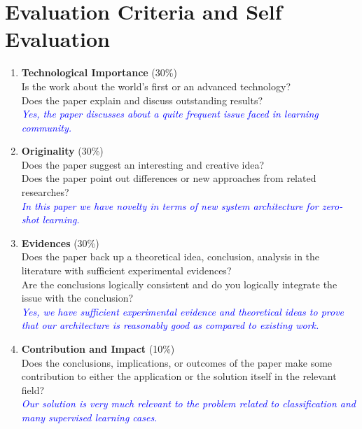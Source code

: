 \documentclass[11pt, conference, english]{IEEEtran}
\theoremstyle{plain}
\theoremstyle{definition}
\theoremstyle{remark}
\newcommand{\blue}[1]{\textcolor{blue}{#1}}
\begin{document}
	
	
	
	
	
	

\onecolumn
\section{Evaluation Criteria and Self Evaluation}
\begin{enumerate}
	\item \textbf{Technological Importance} (30\%)\\
	Is the work about the world's first or an advanced technology?\\
	Does the paper explain and discuss outstanding results? \\
	\textit{\blue{Yes, the paper discusses about a quite frequent issue faced in learning community.}}
	
	\item \textbf{Originality} (30\%)\\
	Does the paper suggest an interesting and creative idea?\\
	Does the paper point out differences or new approaches from related researches?\\
	\textit{\blue{In this paper we have novelty in terms of new system architecture for zero-shot learning.}}
	\item \textbf{Evidences} (30\%)\\
	Does the paper back up a theoretical idea, conclusion, analysis in the literature with sufficient experimental evidences?\\
	Are the conclusions logically consistent and do you logically integrate the issue with the conclusion?\\
	\textit{\blue{Yes, we have sufficient experimental evidence and theoretical ideas to prove that our architecture is reasonably good as compared to existing work.}}
	\item \textbf{Contribution and Impact} (10\%)\\
	Does the conclusions, implications, or outcomes of the paper make some contribution to either the application or the solution itself in the relevant field?\\
	\textit{\blue{Our solution is very much relevant to the problem related to classification and many supervised learning cases.}}
	
	
	
\end{enumerate}
\end{document}
